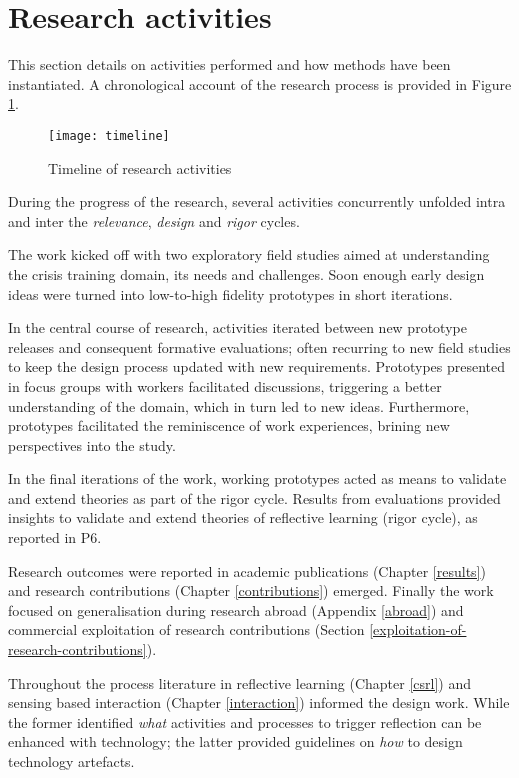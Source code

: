 \section{Research activities}\label{research-activities}

This section details on activities performed and how methods have been instantiated. A chronological account of the research process is provided in Figure \ref{fig:research-activities}.
\begin{figure}
	[p] \centering 
	\texttt{[image: timeline]} \caption{Timeline of research activities} \label{fig:research-activities} 
\end{figure}

During the progress of the research, several activities concurrently unfolded intra and inter the \emph{relevance}, \emph{design} and \emph{rigor} cycles.

The work kicked off with two exploratory field studies aimed at understanding the crisis training domain, its needs and challenges. Soon enough early design ideas were turned into low-to-high fidelity prototypes in short iterations. 

In the central course of research, activities iterated between new prototype releases and consequent formative evaluations; often recurring to new field studies to keep the design process updated with new requirements. Prototypes presented in focus groups with workers facilitated discussions, triggering a better understanding of the domain, which in turn led to new ideas. Furthermore, prototypes facilitated the reminiscence of work experiences, brining new perspectives into the study.

In the final iterations of the work, working prototypes acted as means to validate and extend theories as part of the rigor cycle. Results from evaluations provided insights to validate and extend theories of reflective learning (rigor cycle), as reported in P6. 

Research outcomes were reported in academic publications (Chapter \ref{results}) and research contributions (Chapter \ref{contributions}) emerged. Finally the work focused on generalisation during research abroad (Appendix \ref{abroad}) and commercial exploitation of research contributions (Section \ref{exploitation-of-research-contributions}).

Throughout the process literature in reflective learning (Chapter \ref{csrl}) and sensing based interaction (Chapter \ref{interaction}) informed the design work. While the former identified \emph{what} activities and processes to trigger reflection can be enhanced with technology; the latter provided guidelines on \emph{how} to design technology artefacts.

